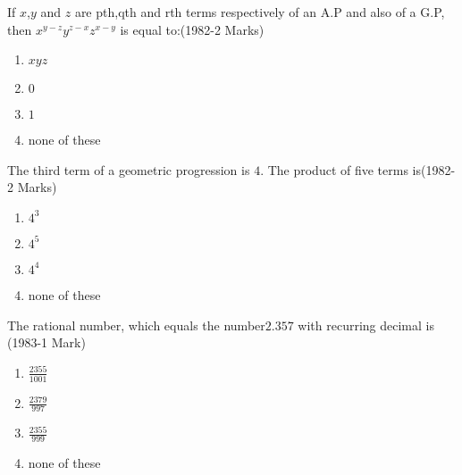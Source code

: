 \iffalse
\title{Assignment1}
\author{Dasari Manikanta}
\section{mcq-single}
\fi
\item  If $x$,$y$ and $z$ are pth,qth and rth terms respectively of an A.P and also of a G.P, then ${x^{y-z} y^{z-x} z^{x-y}}$ 
		    is equal to:\hfill{(1982-2 Marks)}
\begin{enumerate} 
  \item $xyz$ 
  \item $0$
  \item $1$ 
  \item none of these
  \end{enumerate}

	\item  The third term of a geometric progression is $4$. The product of five terms is\hfill{(1982-2 Marks)}
\begin{enumerate}
     \item${4^3}$ 
    \item${4^5}$
    \item${4^4}$
    \item none of these
\end{enumerate}

	\item The rational number, which equals the number$2$.${357}$ with recurring decimal is 
		\hfill{(1983-1 Mark)}
    \begin{enumerate} \itemsep 1ex
        \item $\frac{2355}{1001}$ 
        \item $\frac{2379}{997}$ 
        \item $\frac{2355}{999}$ 
        \item none of these 
    \end{enumerate}
